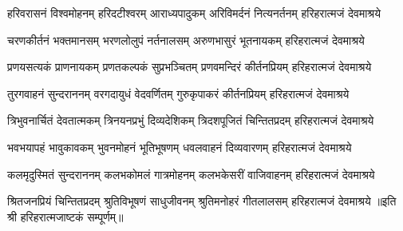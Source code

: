 
\fourlineindentedshloka
{हरिवरासनं विश्वमोहनम्}
{हरिदटीश्वरम् आराध्यपादुकम्}
{अरिविमर्दनं नित्यनर्तनम्}
{हरिहरात्मजं देवमाश्रये}

\fourlineindentedshloka
{चरणकीर्तनं भक्तमानसम्}
{भरणलोलुपं नर्तनालसम्}
{अरुणभासुरं भूतनायकम्}
{हरिहरात्मजं देवमाश्रये}

\fourlineindentedshloka
{प्रणयसत्यकं प्राणनायकम्}
{प्रणतकल्पकं सुप्रभञ्चितम्}
{प्रणवमन्दिरं कीर्तनप्रियम्}
{हरिहरात्मजं देवमाश्रये}

\fourlineindentedshloka
{तुरगवाहनं सुन्दराननम्}
{वरगदायुधं वेदवर्णितम्}
{गुरुकृपाकरं कीर्तनप्रियम्}
{हरिहरात्मजं देवमाश्रये}

\fourlineindentedshloka
{त्रिभुवनार्चितं देवतात्मकम्}
{त्रिनयनप्रभुं दिव्यदेशिकम्}
{त्रिदशपूजितं चिन्तितप्रदम्}
{हरिहरात्मजं देवमाश्रये}

\fourlineindentedshloka
{भवभयापहं भावुकावकम्}
{भुवनमोहनं भूतिभूषणम्}
{धवलवाहनं दिव्यवारणम्}
{हरिहरात्मजं देवमाश्रये}

\fourlineindentedshloka
{कलमृदुस्मितं सुन्दराननम्}
{कलभकोमलं गात्रमोहनम्}
{कलभकेसरीं वाजिवाहनम्}
{हरिहरात्मजं देवमाश्रये}

\fourlineindentedshloka
{श्रितजनप्रियं चिन्तितप्रदम्}
{श्रुतिविभूषणं साधुजीवनम्}
{श्रुतिमनोहरं गीतलालसम्}
{हरिहरात्मजं देवमाश्रये}
॥इति श्री हरिहरात्मजाष्टकं सम्पूर्णम्॥